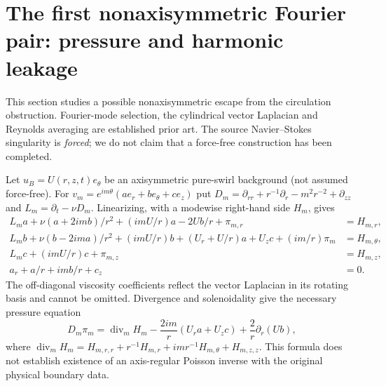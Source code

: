 
\section{The first nonaxisymmetric Fourier pair: pressure and harmonic leakage}
\label{sec:nonaxis-Fourier-XXIII}
This section studies a possible nonaxisymmetric escape from the
circulation obstruction. Fourier-mode selection, the cylindrical
vector Laplacian and Reynolds averaging are established prior art.
The source Navier--Stokes singularity is \emph{forced}; we do not
claim that a force-free construction has been completed.

Let $u_B=U(r,z,t)e_\theta$ be an axisymmetric pure-swirl background
(not assumed force-free). For
$v_m=e^{im\theta}(a e_r+b e_\theta+c e_z)$ put
$D_m=\partial_{rr}+r^{-1}\partial_r-m^2r^{-2}+\partial_{zz}$
and $L_m=\partial_t-\nu D_m$. Linearizing, with a
modewise right-hand side $H_m$, gives
\begin{align}
L_m a+\nu(a+2im b)/r^2+(imU/r)a-2Ub/r+\pi_{m,r}&=H_{m,r},\\
L_m b+\nu(b-2im a)/r^2+(imU/r)b+(U_r+U/r)a+U_zc
  +(im/r)\pi_m&=H_{m,\theta},\\
L_m c+(imU/r)c+\pi_{m,z}&=H_{m,z},\\
a_r+a/r+im b/r+c_z&=0.
\label{eq:nonaxis-system-XXIII}
\end{align}
The off-diagonal viscosity coefficients reflect the vector
Laplacian in its rotating basis and cannot be omitted.
Divergence and solenoidality give the necessary pressure equation
\begin{equation}\label{eq:nonaxis-pressure-XXIII}
D_m\pi_m=\operatorname{div}_mH_m
-\frac{2im}{r}(U_ra+U_zc)+\frac2r\partial_r(Ub),
\end{equation}
where
$\operatorname{div}_mH_m=H_{m,r,r}+r^{-1}H_{m,r}
+im r^{-1}H_{m,\theta}+H_{m,z,z}$.
This formula does not establish existence of an axis-regular
Poisson inverse with the original physical boundary data.

